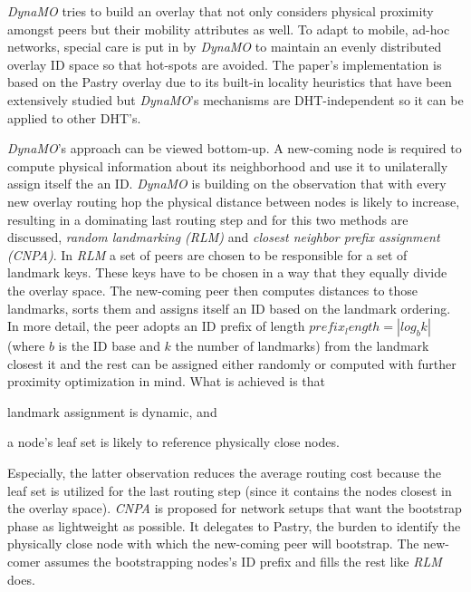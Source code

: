 \emph{DynaMO} \cite{WZS2004} tries to build an overlay that not only 
considers physical proximity amongst peers but their mobility attributes as well.
To adapt to mobile, ad-hoc networks, special care is put in by \emph{DynaMO}
to maintain an evenly distributed overlay ID space so that hot-spots are
avoided. The paper's implementation is based on the Pastry overlay due to its
built-in locality heuristics that have been extensively studied
\cite{CDCR2002a} but \emph{DynaMO}'s mechanisms are DHT-independent so it can be
applied to other DHT's.

\emph{DynaMO}'s approach can be viewed bottom-up. A new-coming node is required
to compute physical information about its neighborhood and use it to
unilaterally assign itself the an ID. \emph{DynaMO} is building on the
observation that with every new overlay routing hop the physical distance
between nodes is likely to increase, resulting in a dominating last routing
step \cite{antony_pastry_2001,CDCR2002a} and for this two methods are discussed,
\emph{random landmarking (RLM)} and \emph{closest neighbor prefix assignment
(CNPA)}.
In \emph{RLM} a set of peers are chosen to be responsible for a set of landmark
keys. These keys have to be chosen in a way that they equally divide the overlay
space. The new-coming peer then computes distances to those
landmarks, sorts them and assigns itself an ID based on the landmark ordering.
In more detail, the peer adopts an ID prefix of length
$prefix_length=|log_b k|$ (where $b$ is the ID base and $k$ the number of
landmarks) from the landmark closest it and the rest can be assigned either
randomly or computed with further proximity optimization in mind.
What is achieved is that
\begin{inparaenum}
  \item landmark assignment is dynamic, and
  \item a node’s leaf set is likely to reference physically close nodes.
\end{inparaenum}
Especially, the latter observation reduces the average routing cost because the
leaf set is utilized for the last routing step (since it contains the nodes
closest in the overlay space).
\emph{CNPA} is proposed for network setups that want the bootstrap phase as lightweight
as possible. It delegates to Pastry, the burden to identify the physically
close node with which the new-coming peer will bootstrap. The new-comer assumes
the bootstrapping nodes's ID prefix and fills the rest like \emph{RLM} does.

